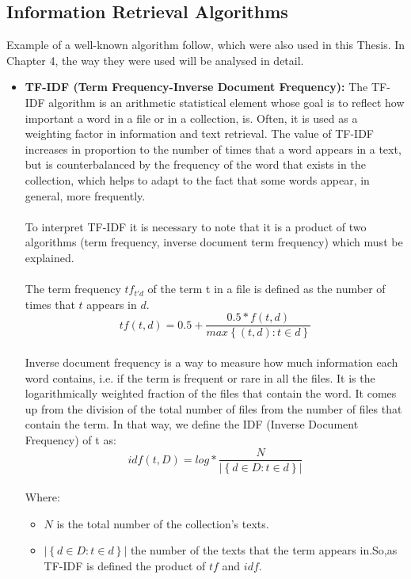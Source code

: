\subsection{Information Retrieval Algorithms}\label{231_ref}
Example of a well-known algorithm follow, which were also used in this Thesis. In Chapter 4, the way they were used will be analysed in detail.\\
\begin{itemize}

	\item \textbf{TF-IDF (Term Frequency-Inverse Document Frequency):} The TF-IDF algorithm is an arithmetic statistical element whose goal is to reflect how important a word in a file or in a collection, is. Often, it is used as a weighting factor in information and text retrieval. The value of TF-IDF increases in proportion to the number of times that a word appears in a text, but is counterbalanced by the frequency of the word that exists in the collection, which helps to adapt to the fact that some words appear, in general, more frequently.\\
\\
To interpret TF-IDF it is necessary to note that it is a product of two algorithms (term frequency, inverse document term frequency) which must be explained.\\
\\
The term frequency $tf_{t'd}$ of the term t in a file is defined as the number of times that $t$ appears in $d$.
\\
\begin{equation}
tf\left(t,d\right)=0.5+\frac{0.5*f\left(t,d\right)}{max\left\lbrace\left(t,d\right):t \in d\right\rbrace}
\end{equation}
\\
Inverse document frequency is a way to measure how much information each word contains, i.e. if the term is frequent or rare in all the files. It is the logarithmically weighted fraction of the files that contain the word. It comes up from the division of the total number of files from the number of files that contain the term. In that way, we define the IDF (Inverse Document Frequency) of t as:
\\
\begin{equation}
idf\left(t,D\right)=log*\frac{N}{|\left\lbrace d \in D :t \in d\right\rbrace|}
\end{equation}
\\
Where:\\
\begin{itemize}

	\item $N$ is the total number of the collection's texts.
	\item $|\left\lbrace d \in D :t \in d\right\rbrace|$ the number of the texts that the term appears in.So,as TF-IDF is defined the product of $tf$ and $idf$.

\end{itemize}

\end{itemize}
